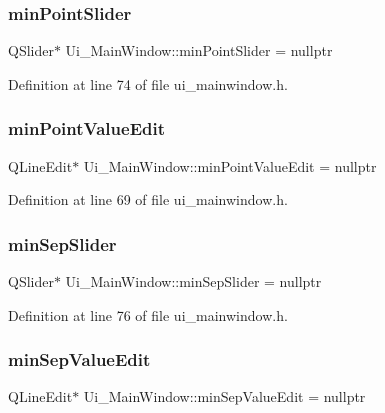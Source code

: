 \subsubsection{\texorpdfstring{minPointSlider}{minPointSlider}}
{\footnotesize\ttfamily Q\+Slider$\ast$ Ui\+\_\+\+Main\+Window\+::min\+Point\+Slider = nullptr}



Definition at line 74 of file ui\+\_\+mainwindow.\+h.

\mbox{\label{class_ui___main_window_a8cf64be1c4bc71168a3baa8f0d085500}} 
\subsubsection{\texorpdfstring{minPointValueEdit}{minPointValueEdit}}
{\footnotesize\ttfamily Q\+Line\+Edit$\ast$ Ui\+\_\+\+Main\+Window\+::min\+Point\+Value\+Edit = nullptr}



Definition at line 69 of file ui\+\_\+mainwindow.\+h.

\mbox{\label{class_ui___main_window_a5520f4e8112132c5abeb44457d13a9b7}} 
\subsubsection{\texorpdfstring{minSepSlider}{minSepSlider}}
{\footnotesize\ttfamily Q\+Slider$\ast$ Ui\+\_\+\+Main\+Window\+::min\+Sep\+Slider = nullptr}



Definition at line 76 of file ui\+\_\+mainwindow.\+h.

\mbox{\label{class_ui___main_window_a8f1c5cf012d41948d24f3086e85237d8}} 
\subsubsection{\texorpdfstring{minSepValueEdit}{minSepValueEdit}}
{\footnotesize\ttfamily Q\+Line\+Edit$\ast$ Ui\+\_\+\+Main\+Window\+::min\+Sep\+Value\+Edit = nullptr}



